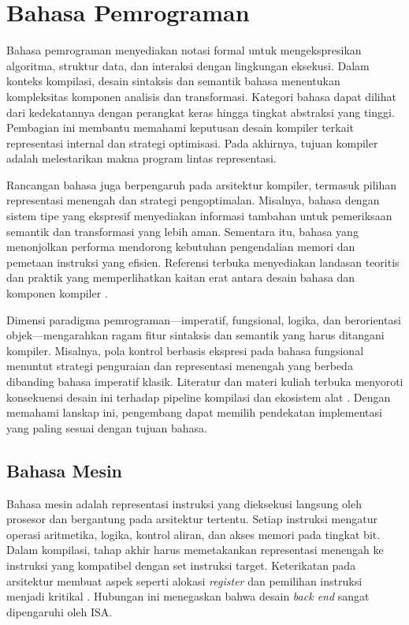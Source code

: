 \documentclass[../main.tex]{subfiles}
\begin{document}
\section{Bahasa Pemrograman}
Bahasa pemrograman menyediakan notasi formal untuk mengekspresikan algoritma, struktur data, dan interaksi dengan lingkungan eksekusi. Dalam konteks kompilasi, desain sintaksis dan semantik bahasa menentukan kompleksitas komponen analisis dan transformasi. Kategori bahasa dapat dilihat dari kedekatannya dengan perangkat keras hingga tingkat abstraksi yang tinggi. Pembagian ini membantu memahami keputusan desain kompiler terkait representasi internal dan strategi optimisasi. Pada akhirnya, tujuan kompiler adalah melestarikan makna program lintas representasi.

Rancangan bahasa juga berpengaruh pada arsitektur kompiler, termasuk pilihan representasi menengah dan strategi pengoptimalan. Misalnya, bahasa dengan sistem tipe yang ekspresif menyediakan informasi tambahan untuk pemeriksaan semantik dan transformasi yang lebih aman. Sementara itu, bahasa yang menonjolkan performa mendorong kebutuhan pengendalian memori dan pemetaan instruksi yang efisien. Referensi terbuka menyediakan landasan teoritis dan praktik yang memperlihatkan kaitan erat antara desain bahasa dan komponen kompiler \citep{CS143,Mogensen2010}.

Dimensi paradigma pemrograman—imperatif, fungsional, logika, dan berorientasi objek—mengarahkan ragam fitur sintaksis dan semantik yang harus ditangani kompiler. Misalnya, pola kontrol berbasis ekspresi pada bahasa fungsional menuntut strategi penguraian dan representasi menengah yang berbeda dibanding bahasa imperatif klasik. Literatur dan materi kuliah terbuka menyoroti konsekuensi desain ini terhadap pipeline kompilasi dan ekosistem alat \citep{CS143,LLVMOverview}. Dengan memahami lanskap ini, pengembang dapat memilih pendekatan implementasi yang paling sesuai dengan tujuan bahasa.

\subsection{Bahasa Mesin}
Bahasa mesin adalah representasi instruksi yang dieksekusi langsung oleh prosesor dan bergantung pada arsitektur tertentu. Setiap instruksi mengatur operasi aritmetika, logika, kontrol aliran, dan akses memori pada tingkat bit. Dalam kompilasi, tahap akhir harus memetakankan representasi menengah ke instruksi yang kompatibel dengan set instruksi target. Keterikatan pada arsitektur membuat aspek seperti alokasi \emph{register} dan pemilihan instruksi menjadi kritikal \citep{WikiRegisterAllocation,WikiInstructionSelection}. Hubungan ini menegaskan bahwa desain \emph{back end} sangat dipengaruhi oleh ISA.
\end{document}
